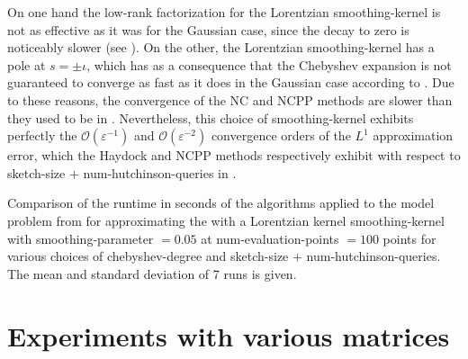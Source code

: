 On one hand the low-rank factorization for the Lorentzian \gls{smoothing-kernel}
is not as effective as it was for the Gaussian case, since the decay to zero
is noticeably slower (see ). On the
other, the Lorentzian \gls{smoothing-kernel} has a pole at $s = \pm \iota$, which
has as a consequence that the Chebyshev expansion is not guaranteed to converge
as fast as it does in the Gaussian case according to .
Due to these reasons, the convergence of the \gls{NC} and \gls{NCPP} methods
are slower than they used to be in .
Nevertheless, this choice of \gls{smoothing-kernel} exhibits perfectly the 
$\mathcal{O}(\varepsilon^{-1})$ and $\mathcal{O}(\varepsilon^{-2})$ convergence
orders of the $L^1$ approximation error, which the Haydock and \gls{NCPP}
methods respectively exhibit with respect to
\gls{sketch-size} $+$ \gls{num-hutchinson-queries} in .\\

\begin{table}[ht]
    \caption{Comparison of the runtime in seconds of the algorithms applied to the model problem
    from 
    for approximating the  with a Lorentzian kernel \gls{smoothing-kernel} with
    \gls{smoothing-parameter} $=0.05$ at \gls{num-evaluation-points} $=100$
    points for various choices of \gls{chebyshev-degree} and \gls{sketch-size} $+$ \gls{num-hutchinson-queries}.
    The mean and standard deviation of 7 runs is given.}
    \label{tab:5-experiments-timing-haydock}
   
\end{table}


\clearpage
\section{Experiments with various matrices}
\label{sec:5-experiments-various-matrices}

